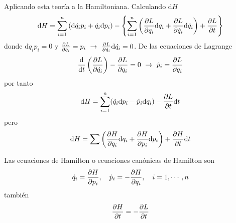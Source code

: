 \documentclass[../main]{subfiles}
\begin{document}
Aplicando esta teoría a la Hamiltoniana. Calculando $\mathrm{d}H$
\begin{equation}
    \mathrm{d}H=\sum_{i=1}^n \left(\mathrm{d}\dot{q}_i p_i+\dot{q}_i \mathrm{d}p_i\right)-\left\{\sum_{i=1}^n\left(\pdv{L}{q_i}\mathrm{d}q_i+\pdv{L}{\dot{q}_i}\mathrm{d}\dot{q}_i\right)+\pdv{L}{t}\right\}
\end{equation}
donde $\mathrm{d}\dot{q}_i p_i=0$ y $\pdv{L}{\dot{q}_i}=p_i \ \rightarrow \ \pdv{L}{\dot{q}_i}\mathrm{d}\dot{q}_i=0$. De las ecuaciones de Lagrange 
\begin{equation}
    \dv{}{t}\left(\pdv{L}{\dot{q}_i}\right)-\pdv{L}{q_i}=0 \ \rightarrow \ \dot{p}_i=\pdv{L}{q_i}
\end{equation}
por tanto 
\begin{equation}
    \mathrm{d}H=\sum_{i=1}^n (\dot{q}_i \mathrm{d}p_i-\dot{p}_i \mathrm{d}q_i)-\pdv{L}{t}\mathrm{d}t
\end{equation}
pero
\begin{equation}
    \mathrm{d}H=\sum\left(\pdv{H}{q_i}\mathrm{d}q_i+\pdv{H}{p_i}\mathrm{d}p_i\right)+\pdv{H}{t}\mathrm{d}t
\end{equation}

Las ecuaciones de Hamilton o ecuaciones canónicas de Hamilton son
\begin{equation}
    \dot{q}_i=\pdv{H}{p_i},\quad \dot{p}_i=-\pdv{H}{q_i},\quad i=1, \cdots, n
\end{equation}
también 
\begin{equation}
    \pdv{H}{t}=-\pdv{L}{t}
\end{equation}
\end{document}
